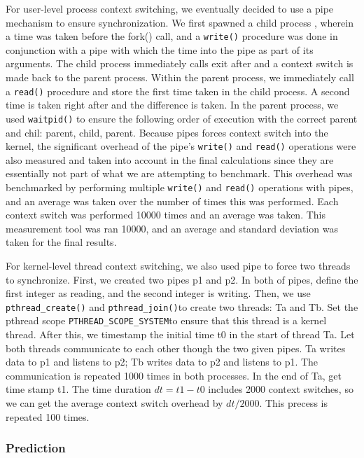 \documentclass{article} %
\begin{document}
For user-level process context switching, we eventually decided to use a pipe
mechanism to ensure synchronization. We first spawned a child process
, wherein a time was taken before the fork() call, and a \texttt{write()} procedure was done in conjunction with a pipe with which the time into the pipe as part of its arguments. The child process
immediately calls exit after and a context switch is made back to the parent
process.  Within the parent process, we immediately call a \texttt{read()}
procedure and store the first time taken in the child process.  A second time
is taken right after and the difference is taken. In the parent process, we
used \texttt{waitpid()} to ensure the following order of execution with the correct parent and chil: parent, child,
parent. Because pipes forces context switch into the kernel, the significant
overhead of the pipe's \texttt{write()} and \texttt{read()} operations were also
measured and taken into account in the final calculations since they are essentially not part of what we are attempting to benchmark. This overhead was benchmarked by performing multiple \texttt{write()} and \texttt{read()} operations with pipes, and an average was taken over the number of times this was performed. Each context switch
was performed 10000 times and an average was taken. This measurement tool was
ran 10000, and an average and standard deviation was taken for the final
results.

For kernel-level thread context switching, we also used pipe to force two
threads to synchronize.  First, we created two pipes p1 and p2. In both of
pipes, define the first integer as reading, and the second integer is writing.
Then, we use \texttt{pthread\_create()} and \texttt{pthread\_join()}to create
two threads: Ta and Tb. Set the pthread scope
\texttt{PTHREAD\_SCOPE\_SYSTEM}to ensure that this thread is a kernel thread.
After this, we timestamp the initial time t0 in the start of thread Ta.  Let
both threads communicate to each other though the two given pipes. Ta writes
data to p1 and listens to p2; Tb writes data to p2 and listens to p1.  The
communication is repeated 1000 times in both processes.  In the end of Ta, get
time stamp t1. The time duration $dt = t1-t0$ includes 2000 context switches,
so we can get the average context switch overhead by $dt/2000$. This precess
is repeated
100 times.

\subsubsection{Prediction}
\end{document}
